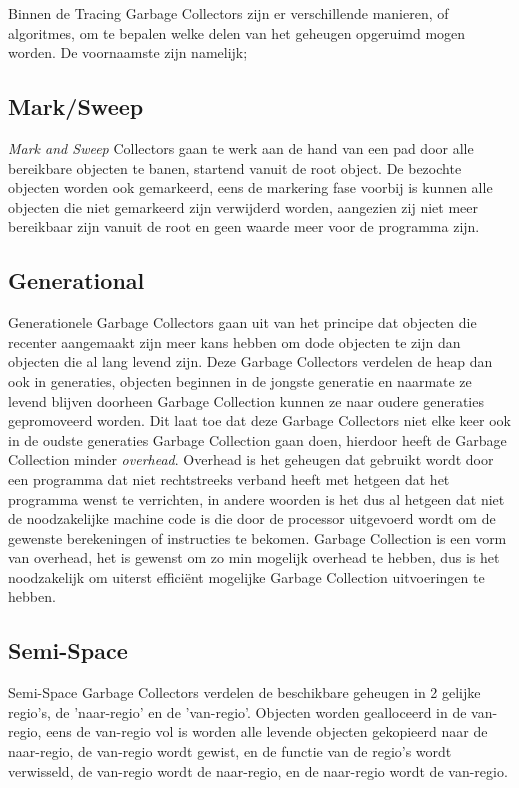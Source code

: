 Binnen de Tracing Garbage Collectors zijn er verschillende manieren, of algoritmes, om te bepalen welke delen van het geheugen opgeruimd mogen worden.
De voornaamste zijn namelijk;
\subsection{Mark/Sweep}
\textit{Mark and Sweep} Collectors gaan te werk aan de hand van een pad door alle bereikbare objecten te banen, startend vanuit de root object. De bezochte objecten worden ook gemarkeerd, eens de markering fase voorbij is kunnen alle objecten die niet gemarkeerd zijn verwijderd worden, aangezien zij niet meer bereikbaar zijn vanuit de root en geen waarde meer voor de programma zijn.


\subsection{Generational}
\label{sec:generational}    
Generationele Garbage Collectors gaan uit van het principe dat objecten die recenter aangemaakt zijn meer kans hebben om dode objecten te zijn dan objecten die al lang levend zijn.
Deze Garbage Collectors verdelen de heap dan ook in generaties, objecten beginnen in de jongste generatie en naarmate ze levend blijven doorheen Garbage Collection kunnen ze naar oudere generaties gepromoveerd worden.
Dit laat toe dat deze Garbage Collectors niet elke keer ook in de oudste generaties Garbage Collection gaan doen, hierdoor heeft de Garbage Collection minder \textit{overhead}.
Overhead is het geheugen dat gebruikt wordt door een programma dat niet rechtstreeks verband heeft met hetgeen dat het programma wenst te verrichten, in andere woorden is het dus al hetgeen dat niet de noodzakelijke machine code is die door de processor uitgevoerd wordt om de gewenste berekeningen of instructies te bekomen.
Garbage Collection is een vorm van overhead, het is gewenst om zo min mogelijk overhead te hebben, dus is het noodzakelijk om uiterst efficiënt mogelijke Garbage Collection uitvoeringen te hebben.



\subsection{Semi-Space}
\label{sec:semi-space}    
Semi-Space Garbage Collectors verdelen de beschikbare geheugen in 2 gelijke regio's, de 'naar-regio' en de 'van-regio'.
Objecten worden gealloceerd in de van-regio, eens de van-regio vol is worden alle levende objecten gekopieerd naar de naar-regio, de van-regio wordt gewist, en de functie van de regio's wordt verwisseld, de van-regio wordt de naar-regio, en de naar-regio wordt de van-regio.
\autocite{Byers2007}



